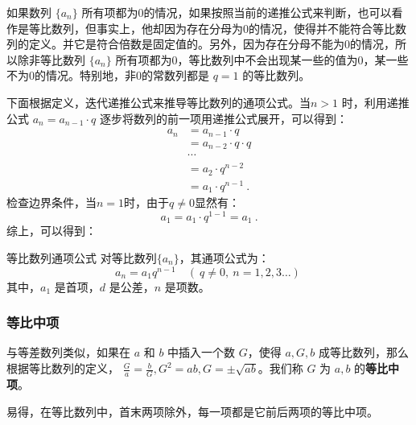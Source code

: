 如果数列 $\{a_n\}$ 所有项都为$0$的情况，如果按照当前的递推公式来判断，也可以看作是等比数列，但事实上，他却因为存在分母为0的情况，使得并不能符合等比数列的定义。并它是符合倍数是固定值的。另外，因为存在分母不能为0的情况，所以除非等比数列 $\{a_n\}$ 所有项都为$0$，等比数列中不会出现某一些的值为0，某一些不为0的情况。特别地，非0的常数列都是 $q = 1$ 的等比数列。

下面根据定义，迭代递推公式来推导等比数列的通项公式。当$n>1$ 时，利用递推公式  $a_n = a_{n-1} \cdot q$ 逐步将数列的前一项用递推公式展开，可以得到：
\begin{equation}
\begin{aligned}
a_n &= a_{n-1} \cdot q\\
&= a_{n-2}\cdot q\cdot q\\
&\cdots \\
&= a_2\cdot q^{n-2}\\
&=  a_1 \cdot q^{n-1}~.
\end{aligned}
\end{equation}
检查边界条件，当$n=1$时，由于$q\neq0$显然有：
\begin{equation}
a_1=a_1\cdot q^{1-1}=a_1~.
\end{equation}
综上，可以得到：
\begin{corollary}{等比数列通项公式}
对等比数列$\{a_n\}$，其通项公式为：
\begin{equation}
a_n = a_1 q^{n-1} \quad (\ q\ne 0,\ n=1,2,3\dots)~
\end{equation}
其中，$a_1$ 是首项，$d$ 是公差，$n$ 是项数。

\end{corollary}




\subsubsection{等比中项}
与等差数列类似，如果在 $a$ 和 $b$ 中插入一个数 $G$，使得 $a,G,b$ 成等比数列，那么根据等比数列的定义， $\frac{G}{a} = \frac{b}{G},G^2 = ab,G = \pm \sqrt{ab}$。我们称 $G$ 为 $a,b$ 的\textbf{等比中项}。

易得，在等比数列中，首末两项除外，每一项都是它前后两项的等比中项。

